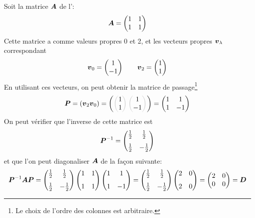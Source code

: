 \begin{exemple}
Soit la matrice $\boldsymbol{A}$ de l': 
\[
 \boldsymbol{A} = \begin{pmatrix}
1 & 1 \\ 1 & 1
\end{pmatrix}
\]
Cette matrice a comme valeurs propres 0 et 2, et les vecteurs propres 
$\boldsymbol{v}_\lambda$ correspondant
\[
\boldsymbol{v}_0 = \begin{pmatrix}
1 \\ -1
\end{pmatrix}\qquad \boldsymbol{v}_2 = \begin{pmatrix}
1 \\ 1
\end{pmatrix}
\]
En utilisant ces vecteurs, on peut obtenir la matrice de passage\footnote{Le choix de l'ordre
des colonnes est arbitraire.}
\[
\mat{P} = (\mat{v}_2 \mat{v}_0) = \left( 
\color{black!20}\left(\color{black}\begin{matrix}
1 \\ 1
\end{matrix}
\color{black!20}\right)\color{black}
\color{black!20}\left(\color{black}\begin{matrix}
1 \\ -1
\end{matrix}
\color{black!20}\right)\color{black}
\right)
= \begin{pmatrix}
1 & 1 \\ 1 & -1
\end{pmatrix}
\]
On peut vérifier que l'inverse de cette matrice est
\[
\boldsymbol{P}^{-1} = \begin{pmatrix}
\frac12 & \frac12 \\[7pt]
\frac12 & -\frac12
\end{pmatrix}
\]
et que l'on peut diagonaliser $\boldsymbol{A}$ de la façon suivante:
\[
\boldsymbol{P}^{-1}\boldsymbol{A}\boldsymbol{P} = \begin{pmatrix}
\frac12 & \frac12 \\[7pt]
\frac12 & -\frac12
\end{pmatrix}
\begin{pmatrix}
1 & 1 \\[7pt] 1 & 1
\end{pmatrix}
\begin{pmatrix}
1 & 1 \\[7pt] 1 & -1
\end{pmatrix}
=
\begin{pmatrix}
\frac12 & \frac12 \\[7pt]
\frac12 & -\frac12
\end{pmatrix}
\begin{pmatrix}
2 & 0 \\[7pt] 2 & 0
\end{pmatrix}
= \begin{pmatrix}
2 & 0 \\ 0 & 0
\end{pmatrix} = \boldsymbol{D}
\]
\end{exemple}


